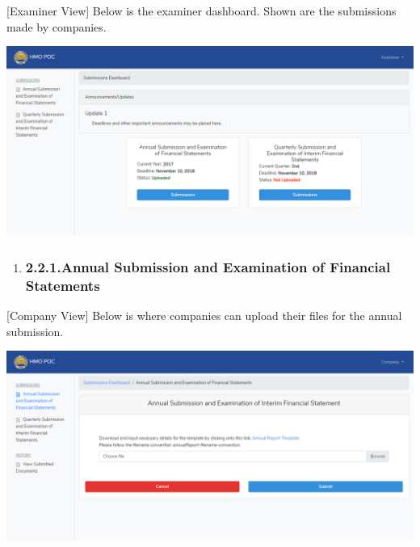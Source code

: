 \documentclass{article}
\begin{document}
[Examiner View] Below is the examiner dashboard.
Shown are the submissions made by companies.%

\includegraphics[keepaspectratio=true]{up-ic-screens/image179}{}%

\begin{enumerate}[noitemsep,topsep=\mdcompacttopsep]%

\item{}
\subsubsection{2.2.1.\hspace*{0.5em}Annual Submission and Examination of Financial Statements}\label{sec-annual-submission-and-examination-of-financial-statements}%
\end{enumerate}%

\noindent{}[Company View] Below is where companies can upload
their files for the annual submission.%

\includegraphics[keepaspectratio=true]{up-ic-screens/image87}{}%
\end{document}
